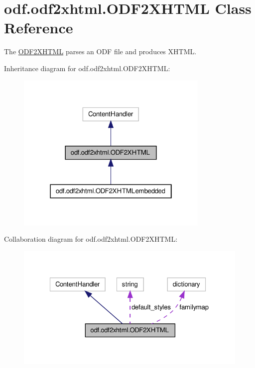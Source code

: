 \hypertarget{classodf_1_1odf2xhtml_1_1ODF2XHTML}{\section{odf.\+odf2xhtml.\+O\+D\+F2\+X\+H\+T\+M\+L Class Reference}
\label{classodf_1_1odf2xhtml_1_1ODF2XHTML}
}


The \hyperlink{classodf_1_1odf2xhtml_1_1ODF2XHTML}{O\+D\+F2\+X\+H\+T\+M\+L} parses an O\+D\+F file and produces X\+H\+T\+M\+L.  




Inheritance diagram for odf.\+odf2xhtml.\+O\+D\+F2\+X\+H\+T\+M\+L\+:
\nopagebreak
\begin{figure}[H]
\begin{center}
\leavevmode
\includegraphics[width=262pt]{classodf_1_1odf2xhtml_1_1ODF2XHTML__inherit__graph}
\end{center}
\end{figure}


Collaboration diagram for odf.\+odf2xhtml.\+O\+D\+F2\+X\+H\+T\+M\+L\+:
\nopagebreak
\begin{figure}[H]
\begin{center}
\leavevmode
\includegraphics[width=322pt]{classodf_1_1odf2xhtml_1_1ODF2XHTML__coll__graph}
\end{center}
\end{figure}

